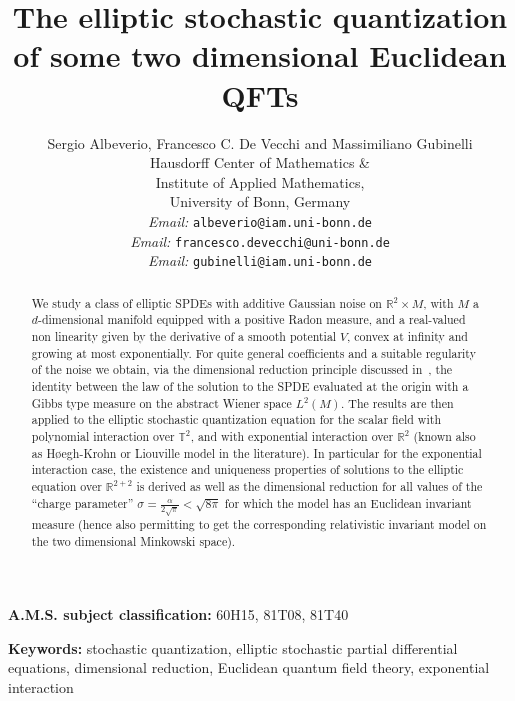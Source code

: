 \documentclass[a4paper,10pt]{article}
\newcommand{\tmaffiliation}[1]{\\ #1}
\newcommand{\tmemail}[1]{\\ \textit{Email:} \texttt{#1}}
\newcommand{\tmkeywords}{\textbf{Keywords:} }
\newcommand{\tmmsc}{\textbf{A.M.S. subject classification:} }
\newcommand{\tmsep}{, }
\begin{document}
\title{
  The elliptic stochastic quantization\\
  of some two dimensional Euclidean QFTs
}

\author{
  Sergio Albeverio, Francesco C. De Vecchi and Massimiliano Gubinelli
  \tmaffiliation{Hausdorff Center of Mathematics \&\\
  Institute of Applied Mathematics, \\
  University of Bonn, Germany}
  \tmemail{albeverio@iam.uni-bonn.de}
  \tmemail{francesco.devecchi@uni-bonn.de}
  \tmemail{gubinelli@iam.uni-bonn.de}
}
\date{}

\maketitle

\begin{abstract}
  We study a class of elliptic SPDEs with additive Gaussian noise on
  $\mathbb{R}^2 \times M$, with $M$ a $d$-dimensional manifold equipped with a
  positive Radon measure, and a real-valued non linearity given by the
  derivative of a smooth potential $V$, convex at infinity and growing at most
  exponentially. For quite general coefficients and a suitable regularity of
  the noise we obtain, via the dimensional reduction principle discussed
  in~{\cite{Albeverio2018elliptic}}, the identity between the law of the
  solution to the SPDE evaluated at the origin with a Gibbs type measure on
  the abstract Wiener space $L^2 (M)$. The results are then applied to the
  elliptic stochastic quantization equation for the scalar field with
  polynomial interaction over $\mathbb{T}^2$, and with exponential interaction
  over $\mathbb{R}^2$ (known also as H{\o}egh-Krohn or Liouville model in the
  literature). In particular for the exponential interaction case, the
  existence and uniqueness properties of solutions to the elliptic equation
  over $\mathbb{R}^{2 + 2}$ is derived as well as the dimensional reduction
  for all values of the ``charge parameter'' $\sigma = \frac{\alpha}{2
  \sqrt{\pi}} < \sqrt{8 \pi}$ for which the model has an Euclidean invariant
  measure (hence also permitting to get the corresponding relativistic
  invariant model on the two dimensional Minkowski space).
\end{abstract}

\tmmsc{60H15}{\tmsep}{81T08}{\tmsep}{81T40}

\tmkeywords{stochastic quantization}{\tmsep}{elliptic stochastic partial
differential equations}{\tmsep}{dimensional reduction}{\tmsep}{Euclidean
quantum field theory}{\tmsep}{exponential interaction}
\end{document}
